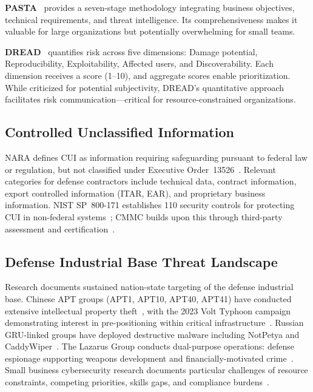 \documentclass[sigconf,nonacm]{acmart}
\begin{document}
\textbf{PASTA}~\cite{ucedavelez2015risk} provides a seven-stage methodology integrating
business objectives, technical requirements, and threat intelligence. Its
comprehensiveness makes it valuable for large organizations but potentially overwhelming
for small teams.

\textbf{DREAD}~\cite{meier2003dread} quantifies risk across five dimensions: Damage
potential, Reproducibility, Exploitability, Affected users, and Discoverability. Each
dimension receives a score (1--10), and aggregate scores enable prioritization. While
criticized for potential subjectivity, DREAD's quantitative approach facilitates risk
communication---critical for resource-constrained organizations.

\subsection{Controlled Unclassified Information}

NARA defines CUI as information requiring safeguarding pursuant to federal law or
regulation, but not classified under Executive Order~13526~\cite{nara2024cui}. Relevant
categories for defense contractors include technical data, contract information, export
controlled information (ITAR, EAR), and proprietary business information. NIST SP~800-171
establishes 110 security controls for protecting CUI in non-federal
systems~\cite{nist2024sp800171}; CMMC builds upon this through third-party assessment
and certification~\cite{dod2024cmmc}.

\subsection{Defense Industrial Base Threat Landscape}

Research documents sustained nation-state targeting of the defense industrial base.
Chinese APT groups (APT1, APT10, APT40, APT41) have conducted extensive intellectual
property theft~\cite{mandiant2023china}, with the 2023 Volt Typhoon campaign
demonstrating interest in pre-positioning within critical
infrastructure~\cite{cisa2024volt}. Russian GRU-linked groups have deployed destructive
malware including NotPetya and CaddyWiper~\cite{greenberg2021sandworm}. The Lazarus
Group conducts dual-purpose operations: defense espionage supporting weapons development
and financially-motivated crime~\cite{crowdstrike2024global}. Small business
cybersecurity research documents particular challenges of resource constraints, competing
priorities, skills gaps, and compliance burdens~\cite{chang2025mind}.
\end{document}
